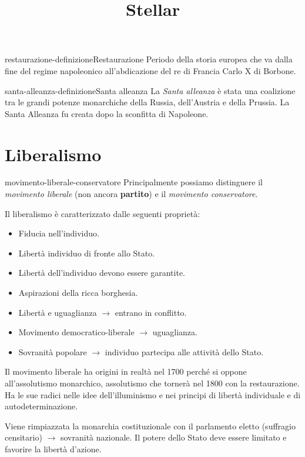 \documentclass[preview]{standalone}
\begin{document}
\title{Stellar}
\genpage

\begin{snippetdefinition}{restaurazione-definizione}{Restaurazione}
    Periodo della storia europea che va dalla fine del regime napoleonico
    all'abdicazione del re di Francia Carlo X di Borbone.
\end{snippetdefinition}

\begin{snippetdefinition}{santa-alleanza-definizione}{Santa alleanza}
    La \textit{Santa alleanza} è stata una coalizione tra le grandi potenze monarchiche della Russia, dell'Austria e della Prussia.
    La Santa Alleanza fu creata dopo la sconfitta di Napoleone.
\end{snippetdefinition}

\section{Liberalismo}

\begin{snippet}{movimento-liberale-conservatore}
    Principalmente possiamo distinguere il \textit{movimento liberale} (non ancora \textbf{partito})
    e il \textit{movimento conservatore}.

    Il liberalismo è caratterizzato dalle seguenti proprietà:
    \begin{itemize}
        \item Fiducia nell'individuo.
        \item Libertà individuo di fronte allo Stato.
        \item Libertà dell'individuo devono essere garantite.
        \item Aspirazioni della ricca borghesia.
        \item Libertà e uguaglianza \(\rightarrow\) entrano in conflitto.
        \item Movimento democratico-liberale \(\rightarrow\) uguaglianza.
        \item Sovranità popolare \(\rightarrow\) individuo partecipa alle attività dello Stato.
    \end{itemize}

    Il movimento liberale ha origini in realtà nel 1700 perché si oppone
    all'assolutismo monarchico, assolutismo che tornerà nel 1800 con la restaurazione.
    Ha le sue radici nelle idee dell'illuminismo e nei principi di libertà individuale e di autodeterminazione.

    Viene rimpiazzata la monarchia costituzionale con il parlamento eletto (suffragio censitario)
    \(\rightarrow\) sovranità nazionale.
    Il potere dello Stato deve essere limitato e favorire la libertà d'azione.
\end{snippet}
\end{document}
